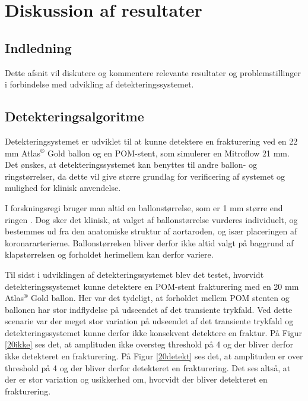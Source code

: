 \chapter{Diskussion af resultater}


\section*{Indledning}
Dette afsnit vil diskutere og kommentere relevante resultater og problemstillinger i forbindelse med udvikling af detekteringssystemet.  

\section{Detekteringsalgoritme}
Detekteringsystemet er udviklet til at kunne detektere en frakturering ved en 22 mm Atlas$^\circledR$ Gold ballon og en POM-stent, som simulerer en Mitroflow 21 mm. Det ønskes, at detekteringssystemet kan benyttes til andre ballon- og ringstørrelser, da dette vil give  større grundlag for verificering af systemet og mulighed for klinisk anvendelse.  

I forskningsregi bruger man altid en ballonstørrelse, som er 1 mm større end ringen \cite{baggrund10}. Dog sker det klinisk, at valget af ballonstørrelse vurderes individuelt, og bestemmes ud fra den anatomiske struktur af aortaroden, og især placeringen af koronararterierne. Ballonstørrelsen bliver derfor ikke altid valgt på baggrund af klapstørrelsen og forholdet herimellem kan derfor variere.

Til sidst i udviklingen af detekteringssystemet blev det testet, hvorvidt detekteringssystemet kunne detektere en POM-stent frakturering med en 20 mm Atlas$^\circledR$ Gold ballon. Her var det tydeligt, at forholdet mellem POM stenten og ballonen har stor indflydelse på udseendet af det transiente trykfald. Ved dette scenarie var der meget stor variation på udseendet af det transiente trykfald og detekteringssystemet kunne derfor ikke konsekvent detektere en fraktur. På Figur \ref{20ikke} ses det, at amplituden ikke oversteg threshold på 4 og der bliver derfor ikke detekteret en frakturering. På Figur \ref{20detekt} ses det, at amplituden er over threshold på 4 og der bliver derfor detekteret en frakturering. Det ses altså, at der er stor variation og usikkerhed om, hvorvidt der bliver detekteret en frakturering.

